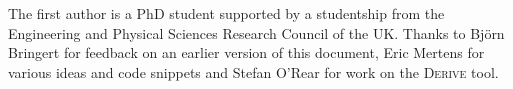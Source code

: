 \documentclass[preprint]{sigplanconf}
\begin{document}
\acks

The first author is a PhD student supported by a studentship from the Engineering and Physical Sciences Research Council of the UK. Thanks to Bj\"{o}rn Bringert for feedback on an earlier version of this document, Eric Mertens for various ideas and code snippets and Stefan O'Rear for work on the \textsc{Derive} tool.



\end{document}

